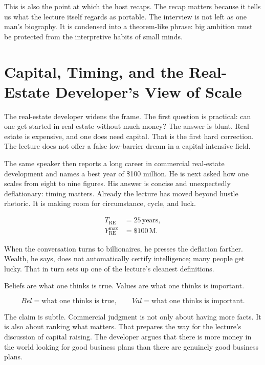 This is also the point at which the host recaps. The recap matters because it tells us what the lecture itself regards as portable. The interview is not left as one man's biography. It is condensed into a theorem-like phrase: big ambition must be protected from the interpretive habits of small minds.

\section{Capital, Timing, and the Real-Estate Developer's View of Scale}

The real-estate developer widens the frame. The first question is practical: can one get started in real estate without much money? The answer is blunt. Real estate is expensive, and one does need capital. That is the first hard correction. The lecture does not offer a false low-barrier dream in a capital-intensive field.

The same speaker then reports a long career in commercial real-estate development and names a best year of \$100 million. He is next asked how one scales from eight to nine figures. His answer is concise and unexpectedly deflationary: timing matters. Already the lecture has moved beyond hustle rhetoric. It is making room for circumstance, cycle, and luck.

\begin{align}
T_{\text{RE}} &= 25\,\text{years},\\
Y^{\max}_{\text{RE}} &= \$100\,\mathrm{M}.
\end{align}

When the conversation turns to billionaires, he presses the deflation farther. Wealth, he says, does not automatically certify intelligence; many people get lucky. That in turn sets up one of the lecture's cleanest definitions.

\begin{definition}
Beliefs are what one thinks is true. Values are what one thinks is important.
\end{definition}

\begin{equation}
Bel = \text{what one thinks is true},\qquad Val = \text{what one thinks is important}.
\end{equation}

The claim is subtle. Commercial judgment is not only about having more facts. It is also about ranking what matters. That prepares the way for the lecture's discussion of capital raising. The developer argues that there is more money in the world looking for good business plans than there are genuinely good business plans.

